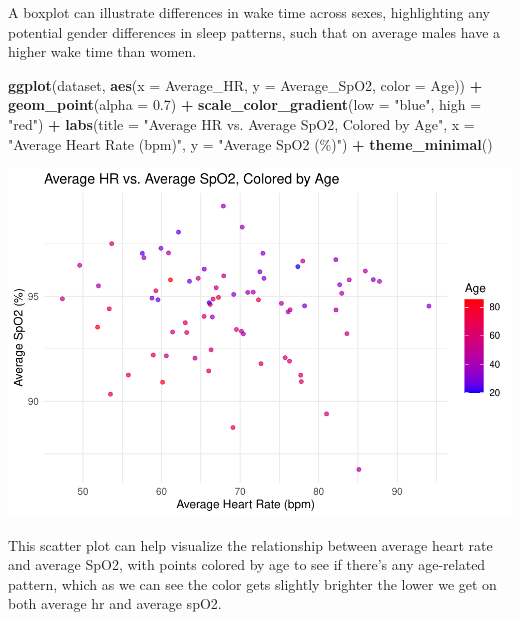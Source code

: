 \documentclass[
]{article}
\newenvironment{Shaded}{\begin{snugshade}}{\end{snugshade}}
\newcommand{\AttributeTok}[1]{\textcolor[rgb]{0.13,0.29,0.53}{#1}}
\newcommand{\FloatTok}[1]{\textcolor[rgb]{0.00,0.00,0.81}{#1}}
\newcommand{\FunctionTok}[1]{\textcolor[rgb]{0.13,0.29,0.53}{\textbf{#1}}}
\newcommand{\NormalTok}[1]{#1}
\newcommand{\SpecialCharTok}[1]{\textcolor[rgb]{0.81,0.36,0.00}{\textbf{#1}}}
\newcommand{\StringTok}[1]{\textcolor[rgb]{0.31,0.60,0.02}{#1}}
\begin{document}
A boxplot can illustrate differences in wake time across sexes,
highlighting any potential gender differences in sleep patterns, such
that on average males have a higher wake time than women.

\begin{Shaded}
\begin{Highlighting}[]
\FunctionTok{ggplot}\NormalTok{(dataset, }\FunctionTok{aes}\NormalTok{(}\AttributeTok{x =}\NormalTok{ Average\_HR, }\AttributeTok{y =}\NormalTok{ Average\_SpO2, }\AttributeTok{color =}\NormalTok{ Age)) }\SpecialCharTok{+} 
  \FunctionTok{geom\_point}\NormalTok{(}\AttributeTok{alpha =} \FloatTok{0.7}\NormalTok{) }\SpecialCharTok{+} 
  \FunctionTok{scale\_color\_gradient}\NormalTok{(}\AttributeTok{low =} \StringTok{"blue"}\NormalTok{, }\AttributeTok{high =} \StringTok{"red"}\NormalTok{) }\SpecialCharTok{+} 
  \FunctionTok{labs}\NormalTok{(}\AttributeTok{title =} \StringTok{"Average HR vs. Average SpO2, Colored by Age"}\NormalTok{,}
       \AttributeTok{x =} \StringTok{"Average Heart Rate (bpm)"}\NormalTok{, }\AttributeTok{y =} \StringTok{"Average SpO2 (\%)"}\NormalTok{) }\SpecialCharTok{+} 
  \FunctionTok{theme\_minimal}\NormalTok{()}
\end{Highlighting}
\end{Shaded}

\includegraphics{602_project_files/figure-latex/unnamed-chunk-17-1.pdf}

This scatter plot can help visualize the relationship between average
heart rate and average SpO2, with points colored by age to see if
there's any age-related pattern, which as we can see the color gets
slightly brighter the lower we get on both average hr and average spO2.
\end{document}
